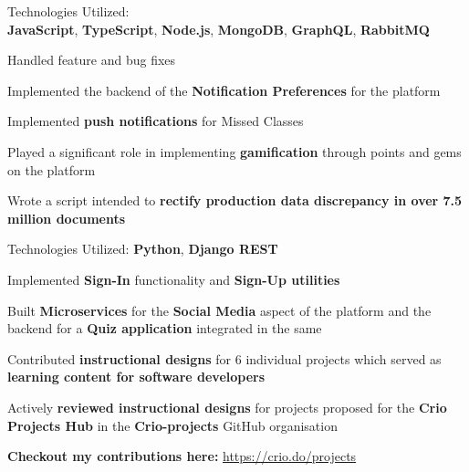 \documentclass[]{deedy-resume-openfont}
\begin{document}
\begin{minipage}[t]{0.66\textwidth}
\sectionsep
\begin{tightemize}
\item Technologies Utilized: \\\textbf{JavaScript}, \textbf{TypeScript}, \textbf{Node.js}, \textbf{MongoDB}, \textbf{GraphQL}, \textbf{RabbitMQ}
\item Handled feature and bug fixes
\item Implemented the backend of the \textbf{Notification Preferences} for the platform
\item Implemented \textbf{push notifications} for Missed Classes
\item Played a significant role in implementing \textbf{gamification} through points and gems on the platform
\item Wrote a script intended to \textbf{rectify production data discrepancy in over 7.5 million documents}
\end{tightemize}

\begin{tightemize}
\item Technologies Utilized: \textbf{Python}, \textbf{Django REST}
\item Implemented \textbf{Sign-In} functionality and \textbf{Sign-Up utilities}
\item Built \textbf{Microservices} for the \textbf{Social Media} aspect of the platform and the backend for a \textbf{Quiz application} integrated in the same
\end{tightemize}

\begin{tightemize}
\item Contributed \textbf{instructional designs} for 6 individual projects which served as \textbf{learning content for software developers}
\item Actively \textbf{reviewed instructional designs} for projects proposed for the \textbf{Crio Projects Hub} in the \textbf{Crio-projects} GitHub organisation
\item \textbf{Checkout my contributions here:} \href{https://crio.do/projects}{https://crio.do/projects}
\end{tightemize}


\end{minipage}
\end{document}
